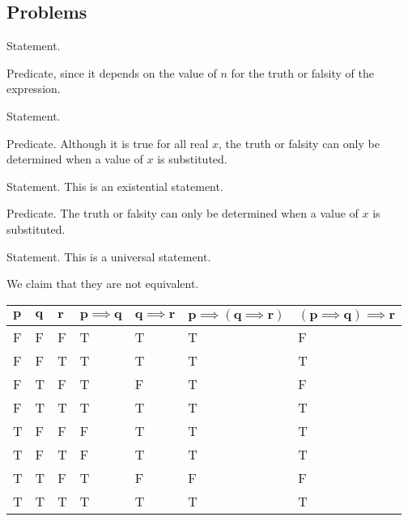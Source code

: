 \subsection*{Problems}
\begin{questions}
    \item \begin{partquestions}{\alph*}
        \item Statement.
        \item Predicate, since it depends on the value of $n$ for the truth or falsity of the expression.
        \item Statement.
        \item Predicate. Although it is true for all real $x$, the truth or falsity can only be determined when a value of $x$ is substituted.
        \item Statement. This is an existential statement.
        \item Predicate. The truth or falsity can only be determined when a value of $x$ is substituted.
        \item Statement. This is a universal statement.
    \end{partquestions}

    \item \begin{partquestions}{\alph*}
        \item We claim that they are not equivalent.
        \begin{table}[h]
            \centering
            \fontsize{8pt}{11pt}\selectfont
            \begin{tabular}{|l|l|l||l|l||l|l|}
                \hline
                $\boldsymbol{p}$ & $\boldsymbol{q}$ & $\boldsymbol{r}$ & $\boldsymbol{p \implies q}$ & $\boldsymbol{q \implies r}$ & $\boldsymbol{p \implies (q \implies r)}$ & $\boldsymbol{(p \implies q) \implies r}$ \\ \hline
                F & F & F & T & T & T & F \\ \hline
                F & F & T & T & T & T & T \\ \hline
                F & T & F & T & F & T & F \\ \hline
                F & T & T & T & T & T & T \\ \hline
                T & F & F & F & T & T & T \\ \hline
                T & F & T & F & T & T & T \\ \hline
                T & T & F & T & F & F & F \\ \hline
                T & T & T & T & T & T & T \\ \hline
            \end{tabular}
        \end{table}


\end{partquestions}
\end{questions}

